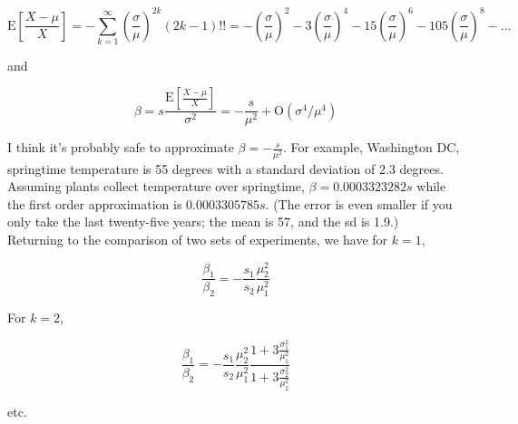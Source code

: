 \documentclass[11pt,letter]{article}
\begin{document}
$$\text{E} \left  [\frac{X - \mu}{X} \right ] = - \sum_{k=1}^{\infty} \left ( \frac{\sigma}{\mu} \right )^{2k} (2k-1)!! = -\left( \frac{\sigma}{\mu} \right )^2 - 3 \left( \frac{\sigma}{\mu} \right )^4 - 15 \left( \frac{\sigma}{\mu} \right )^6 - 105 \left( \frac{\sigma}{\mu} \right )^8 - \ldots$$ 

and

$$\beta = s\frac{\text{E} \left  [\frac{X - \mu}{X} \right ]}{\sigma^2} = - \frac{s}{\mu^2}  + \text{O}(\sigma^4/\mu^4) $$ 

I think it's probably safe to approximate $\beta = - \frac{s}{\mu^2}$. For example, Washington DC, springtime temperature is 55 degrees with a standard deviation of 2.3 degrees. Assuming plants collect temperature over springtime, $\beta = 0.0003323282 s $ while the first order approximation is $0.0003305785 s$. (The error is even smaller if you only take the last twenty-five years; the mean is 57, and the sd is 1.9.)  \\

Returning to the comparison of two sets of experiments, we have for $k=1$,

$$\frac{\beta_1}{\beta_2} = - \frac{s_1}{s_2} \frac{\mu_2^2}{\mu_1^2}$$

For $k=2$,

$$\frac{\beta_1}{\beta_2} = - \frac{s_1}{s_2} \frac{\mu_2^2}{\mu_1^2} \frac{1 + 3\frac{\sigma^2_1}{\mu_1^2}}{1 + 3\frac{\sigma^2_2}{\mu_2^2}} $$

etc.
\end{document}
